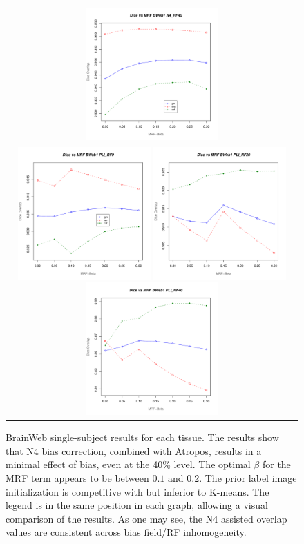 \documentclass[11pt,english]{article}
\begin{document}
\begin{figure}
\begin{center}
\begin{tabular}{c}
\includegraphics[height=2in]{Figures/tissue_dice_vs_mrf_N4_RF40.pdf}\\
\includegraphics[height=2in]{Figures/tissue_dice_vs_mrf_PLI_RF0.pdf}
\includegraphics[height=2in]{Figures/tissue_dice_vs_mrf_PLI_RF20.pdf}
\includegraphics[height=2in]{Figures/tissue_dice_vs_mrf_PLI_RF40.pdf}
\end{tabular}
\caption{\baselineskip 12pt \small BrainWeb single-subject results for
  each tissue.  The results show that N4 bias correction, combined with Atropos, results in a minimal effect of
  bias, even at the 40\% level.  The optimal $\beta$ for the MRF term
  appears to be between $0.1$ and $0.2$.  The prior label image
  initialization is competitive with but inferior to K-means.  The
  legend is in the same position in each graph, allowing a visual
  comparison of the results.  As one may see, the N4 assisted overlap
  values are consistent across bias field/RF inhomogeneity.}
\label{fig:bweb1}
\end{center}
\end{figure}
\end{document}
